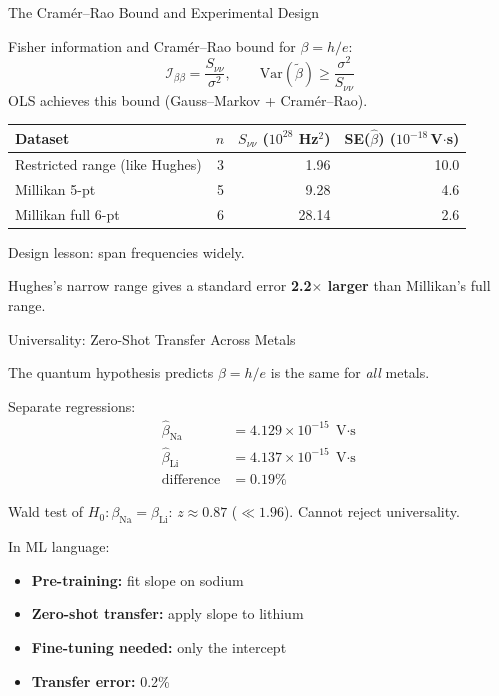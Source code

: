 \documentclass[aspectratio=169]{beamer}
\begin{document}
\begin{frame}{The Cram\'er--Rao Bound and Experimental Design}

Fisher information and Cram\'er--Rao bound for $\beta = h/e$:
\[
  \mathcal{I}_{\beta\beta} = \frac{S_{\nu\nu}}{\sigma^2},
  \qquad
  \mathrm{Var}(\tilde\beta) \geq \frac{\sigma^2}{S_{\nu\nu}}
\]
OLS achieves this bound (Gauss--Markov + Cram\'er--Rao).

\medskip
\begin{center}
\small
\begin{tabular}{p{5.3cm}rrr}
\toprule
Dataset & $n$ & $S_{\nu\nu}$ ($10^{28}$ Hz$^2$) & SE($\hat\beta$) ($10^{-18}$\,V$\cdot$s) \\
\midrule
Restricted range (like Hughes) & 3 & 1.96  & 10.0 \\
Millikan 5-pt                  & 5 & 9.28  &  4.6 \\
Millikan full 6-pt             & 6 & 28.14 &  2.6 \\
\bottomrule
\end{tabular}
\end{center}

\medskip
Design lesson: span frequencies widely.

Hughes's narrow range gives a standard error \textbf{2.2$\times$ larger}
than Millikan's full range.

\end{frame}

\begin{frame}{Universality: Zero-Shot Transfer Across Metals}

The quantum hypothesis predicts $\beta = h/e$ is the same for
\emph{all} metals. %

\medskip
Separate regressions:
\begin{align*}
  \hat\beta_{\mathrm{Na}} &= 4.129\times10^{-15}\;\text{V$\cdot$s} \\
  \hat\beta_{\mathrm{Li}} &= 4.137\times10^{-15}\;\text{V$\cdot$s} \\
  \text{difference} &= 0.19\%
\end{align*}

Wald test of $H_0\colon \beta_{\mathrm{Na}} = \beta_{\mathrm{Li}}$:\quad
$z \approx 0.87$ ($\ll 1.96$). Cannot reject universality.

\medskip
In ML language:
\begin{itemize}
  \item \textbf{Pre-training:} fit slope on sodium
  \item \textbf{Zero-shot transfer:} apply slope to lithium
  \item \textbf{Fine-tuning needed:} only the intercept %
  \item \textbf{Transfer error:} 0.2\%
\end{itemize}

\end{frame}
\end{document}
